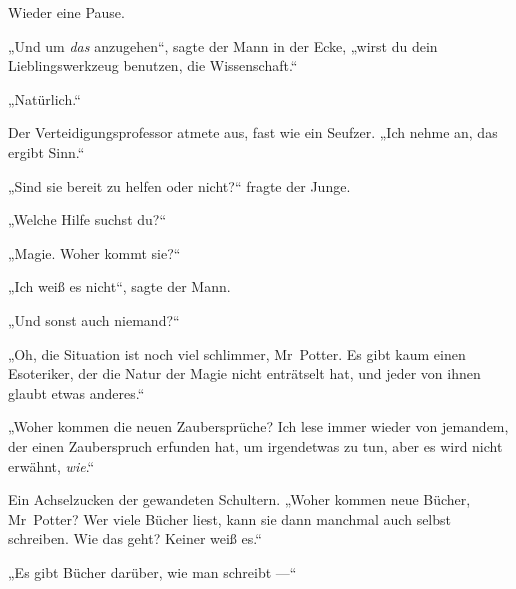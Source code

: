 Wieder eine Pause.

„Und um \emph{das} anzugehen“, sagte der Mann in der Ecke, „wirst du dein Lieblingswerkzeug benutzen, die Wissenschaft.“

„Natürlich.“

Der Verteidigungsprofessor atmete aus, fast wie ein Seufzer.
„Ich nehme an, das ergibt Sinn.“

„Sind sie bereit zu helfen oder nicht?“ fragte der Junge.

„Welche Hilfe suchst du?“

„Magie. Woher kommt sie?“

„Ich weiß es nicht“, sagte der Mann.

„Und sonst auch niemand?“

„Oh, die Situation ist noch viel schlimmer, Mr~Potter. Es gibt kaum einen Esoteriker, der die Natur der Magie nicht enträtselt hat, und jeder von ihnen glaubt etwas anderes.“

„Woher kommen die neuen Zaubersprüche? Ich lese immer wieder von jemandem, der einen Zauberspruch erfunden hat, um irgendetwas zu tun, aber es wird nicht erwähnt, \emph{wie}.“

Ein Achselzucken der gewandeten Schultern.
„Woher kommen neue Bücher, Mr~Potter? Wer viele Bücher liest, kann sie dann manchmal auch selbst schreiben. Wie das geht? Keiner weiß es.“

„Es gibt Bücher darüber, wie man schreibt —“

